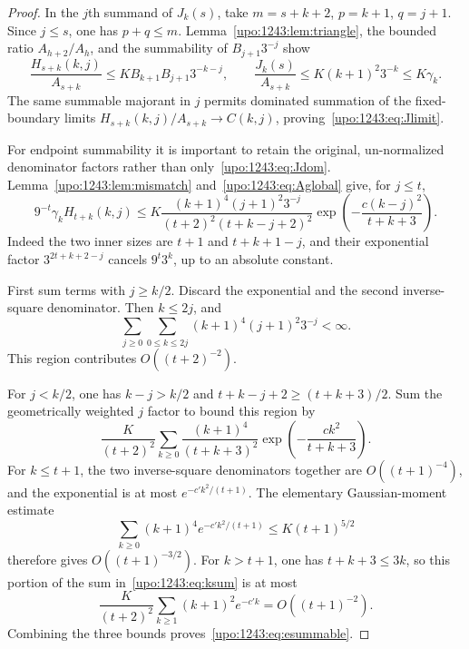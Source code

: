 \documentclass[11pt,letterpaper]{article}
\theoremstyle{remark}\newtheorem{remark}[theorem]{Remark}
\numberwithin{equation}{section}
\begin{document}
\begin{proof}
In the $j$th summand of $J_k(s)$, take
$m=s+k+2$, $p=k+1$, $q=j+1$. Since $j\le s$, one has $p+q\le m$.
Lemma~\ref{upo:1243:lem:triangle}, the bounded ratio $A_{h+2}/A_h$, and the
summability of $B_{j+1}3^{-j}$ show
\[
 \frac{H_{s+k}(k,j)}{A_{s+k}}
 \le K B_{k+1}B_{j+1}3^{-k-j},
 \qquad
 \frac{J_k(s)}{A_{s+k}}
 \le K(k+1)^2 3^{-k}\le K\gamma_k.
\]
The same summable majorant in $j$ permits dominated summation of the
fixed-boundary limits
$H_{s+k}(k,j)/A_{s+k}\longrightarrow C(k,j)$, proving~\eqref{upo:1243:eq:Jlimit}.

For endpoint summability it is important to retain the original,
un-normalized denominator factors rather than only~\eqref{upo:1243:eq:Jdom}.
Lemma~\ref{upo:1243:lem:mismatch} and~\eqref{upo:1243:eq:Aglobal} give, for $j\le t$,
\begin{equation}\label{upo:1243:eq:endpointterm}
 9^{-t}\gamma_k H_{t+k}(k,j)
 \le K\frac{(k+1)^4(j+1)^2 3^{-j}}
              {(t+2)^2(t+k-j+2)^2}
 \exp\left(-\frac{c(k-j)^2}{t+k+3}\right).
\end{equation}
Indeed the two inner sizes are $t+1$ and $t+k+1-j$, and their exponential
factor $3^{2t+k+2-j}$ cancels $9^t3^k$, up to an absolute constant.

First sum terms with $j\ge k/2$. Discard the exponential and the second
inverse-square denominator. Then $k\le2j$, and
\[
 \sum_{j\ge0}\sum_{0\le k\le2j}
 (k+1)^4(j+1)^2 3^{-j}<\infty.
\]
This region contributes $O((t+2)^{-2})$.

For $j<k/2$, one has $k-j>k/2$ and
$t+k-j+2\ge(t+k+3)/2$. Sum the geometrically weighted $j$ factor to bound
this region by
\begin{equation}\label{upo:1243:eq:ksum}
 \frac K{(t+2)^2}\sum_{k\ge0}
 \frac{(k+1)^4}{(t+k+3)^2}
 \exp\left(-\frac{c k^2}{t+k+3}\right).
\end{equation}
For $k\le t+1$, the two inverse-square denominators together are
$O((t+1)^{-4})$, and the exponential is at most
$e^{-c'k^2/(t+1)}$. The elementary Gaussian-moment estimate
\[
 \sum_{k\ge0}(k+1)^4 e^{-c'k^2/(t+1)}
 \le K(t+1)^{5/2}
\]
therefore gives $O((t+1)^{-3/2})$.
For $k>t+1$, one has $t+k+3\le3k$, so this portion of the sum
in~\eqref{upo:1243:eq:ksum} is at most
\[
 \frac K{(t+2)^2}\sum_{k\ge1}(k+1)^2e^{-c'k}
 =O((t+1)^{-2}).
\]
Combining the three bounds proves~\eqref{upo:1243:eq:esummable}.
\end{proof}
\end{document}
